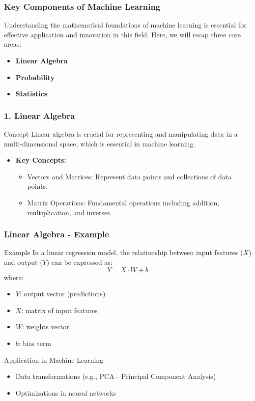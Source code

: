 \documentclass[aspectratio=169]{beamer}
\begin{document}
\begin{frame}[fragile]
    \frametitle{Key Components of Machine Learning}
    Understanding the mathematical foundations of machine learning is essential for effective application and innovation in this field. Here, we will recap three core areas:
    \begin{itemize}
        \item \textbf{Linear Algebra}
        \item \textbf{Probability}
        \item \textbf{Statistics}
    \end{itemize}
\end{frame}

\begin{frame}[fragile]
    \frametitle{1. Linear Algebra}
    \begin{block}{Concept}
        Linear algebra is crucial for representing and manipulating data in a multi-dimensional space, which is essential in machine learning.
    \end{block}
    \begin{itemize}
        \item \textbf{Key Concepts:}
        \begin{itemize}
            \item Vectors and Matrices: Represent data points and collections of data points.
            \item Matrix Operations: Fundamental operations including addition, multiplication, and inverses.
        \end{itemize}
    \end{itemize}
\end{frame}

\begin{frame}[fragile]
    \frametitle{Linear Algebra - Example}
    \begin{block}{Example}
        In a linear regression model, the relationship between input features ($X$) and output ($Y$) can be expressed as:
        \begin{equation}
            Y = X \cdot W + b
        \end{equation}
        where:
        \begin{itemize}
            \item $Y$: output vector (predictions)
            \item $X$: matrix of input features
            \item $W$: weights vector
            \item $b$: bias term
        \end{itemize}
    \end{block}
    \begin{block}{Application in Machine Learning}
        \begin{itemize}
            \item Data transformations (e.g., PCA - Principal Component Analysis)
            \item Optimizations in neural networks
        \end{itemize}
    \end{block}
\end{frame}
\end{document}

